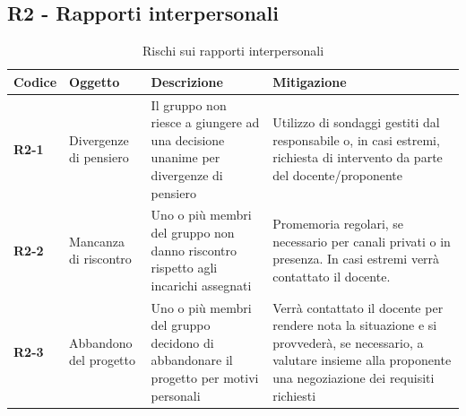 \documentclass[a4paper,12pt]{article}
\begin{document}
    \subsection{R2 - Rapporti interpersonali}
        \begin{table}[H]
        \caption{Rischi sui rapporti interpersonali}
        \label{tab:r2}
            \begin{tabularx}{\textwidth}{|l|L|L|L|}
            \hline
            \textbf{Codice} & \textbf{Oggetto} & \textbf{Descrizione} & \textbf{Mitigazione}\\
            \hline
            \textbf{R2-1} & Divergenze di pensiero & Il gruppo non riesce a giungere ad una decisione unanime per divergenze di pensiero & Utilizzo di sondaggi gestiti dal responsabile o, in casi estremi, richiesta di intervento da parte del docente/proponente\\
            \hline
            \textbf{R2-2} & Mancanza di riscontro & Uno o più membri del gruppo non danno riscontro rispetto agli incarichi assegnati & Promemoria regolari, se necessario per canali privati o in presenza. In casi estremi verrà contattato il docente.\\
            \hline
            \textbf{R2-3} & Abbandono del progetto & Uno o più membri del gruppo decidono di abbandonare il progetto per motivi personali & Verrà contattato il docente per rendere nota la situazione e si provvederà, se necessario, a valutare insieme alla proponente una negoziazione dei requisiti richiesti \\
            \hline
            \end{tabularx}
        \end{table}
        
\end{document}
